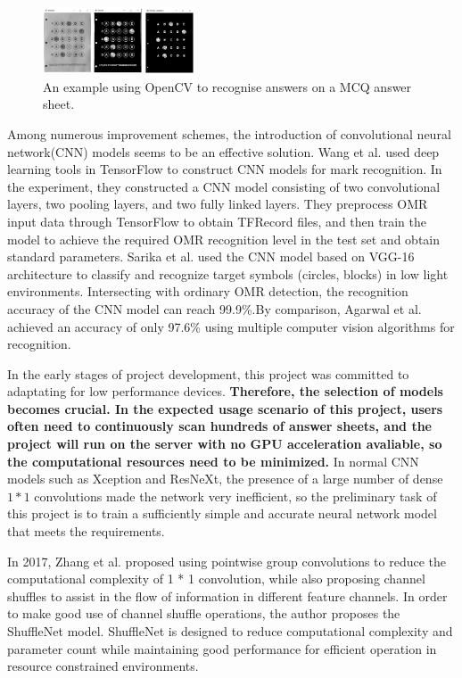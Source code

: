 \documentclass[twocolumn]{article}
\begin{document}
        \begin{figure}[h]
            \centering
            \includegraphics[width=0.4\textwidth]{opencv_omr.png}
            \caption{An example using OpenCV to recognise answers on a MCQ answer sheet\cite{OpenCV_sheet}.}
            \label{fig:opencv_omr}
        \end{figure}


        Among numerous improvement schemes, the introduction of convolutional neural network(CNN)\cite{cnn_1}  models seems to be an effective solution. Wang et al.\cite{omr_ieee2_wang} used deep learning tools in TensorFlow to construct CNN models for mark recognition. In the experiment, they constructed a CNN model consisting of two convolutional layers, two pooling layers, and two fully linked layers. They preprocess OMR input data through TensorFlow to obtain TFRecord files, and then train the model to achieve the required OMR recognition level in the test set and obtain standard parameters. Sarika et al.\cite{omr_ieee3} used the CNN model based on VGG-16 architecture to classify and recognize target symbols (circles, blocks) in low light environments. Intersecting with ordinary OMR detection, the recognition accuracy of the CNN model can reach 99.9\%.By comparison, Agarwal et al.\cite{Scanner} achieved an accuracy of only 97.6\% using multiple computer vision algorithms for recognition.

        In the early stages of project development, this project was committed to adaptating for low performance devices. \textbf{Therefore, the selection of models becomes crucial. In the expected usage scenario of this project, users often need to continuously scan hundreds of answer sheets, and the project will run on the server with no GPU acceleration avaliable, so the computational resources need to be minimized.} In normal CNN models such as Xception and ResNeXt\cite{ResNeXt}, the presence of a large number of dense $1 * 1$ convolutions made the network very inefficient\cite{Zeki}, so the preliminary task of this project is to train a sufficiently simple and accurate neural network model that meets the requirements.

        In 2017, Zhang et al.\cite{zhang2017shufflenet} proposed using pointwise group convolutions to reduce the computational complexity of 1 * 1 convolution, while also proposing channel shuffles to assist in the flow of information in different feature channels. In order to make good use of channel shuffle operations, the author proposes the ShuffleNet model. ShuffleNet is designed to reduce computational complexity and parameter count while maintaining good performance for efficient operation in resource constrained environments.
\end{document}
